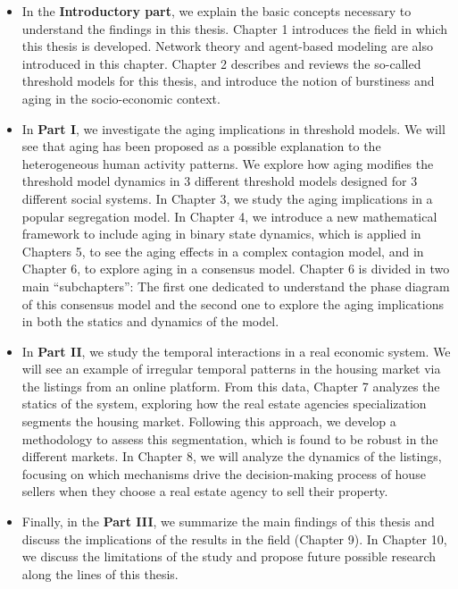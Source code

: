 \begin{itemize}
    \item In the \textbf{Introductory part}, we explain the basic concepts necessary to understand the findings in this thesis. Chapter 1 introduces the field in which this thesis is developed. Network theory and agent-based modeling are also introduced in this chapter. Chapter 2 describes and reviews the so-called threshold models for this thesis, and introduce the notion of burstiness and aging in the socio-economic context. 

    \item In \textbf{Part I}, we investigate the aging implications in threshold models. We will see that aging has been proposed as a possible explanation to the heterogeneous human activity patterns. We explore how aging modifies the threshold model dynamics in 3 different threshold models designed for 3 different social systems. In Chapter 3, we study the aging implications in a popular segregation model. In Chapter 4, we introduce a new mathematical framework to include aging in binary state dynamics, which is applied in Chapters 5, to see the aging effects in a complex contagion model, and in Chapter 6, to explore aging in a consensus model. Chapter 6 is divided in two main ``subchapters'': The first one dedicated to understand the phase diagram of this consensus model and the second one to explore the aging implications in both the statics and dynamics of the model.
    
    \item In \textbf{Part II}, we study the temporal interactions in a real economic system. We will see an example of irregular temporal patterns in the housing market via the listings from an online platform.  From this data, Chapter 7 analyzes the statics of the system, exploring how the real estate agencies specialization segments the housing market. Following this approach, we develop a methodology to assess this segmentation, which is found to be robust in the different markets. In Chapter 8, we will analyze the dynamics of the listings, focusing on which mechanisms drive the decision-making process of house sellers when they choose a real estate agency to sell their property. 
    
    \item Finally, in the \textbf{Part III}, we summarize the main findings of this thesis and discuss the implications of the results in the field (Chapter 9). In Chapter 10, we discuss the limitations of the study and propose future possible research along the lines of this thesis.
\end{itemize}

